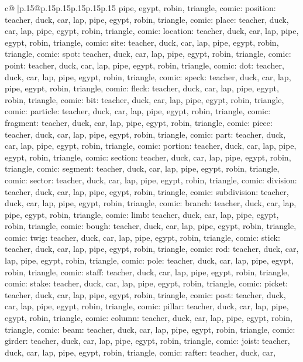 \documentclass{article}
\begin{document}
{\begin{supertabular}{c@{$\;$}|p{.15\linewidth}@{}p{.15\linewidth}p{.15\linewidth}p{.15\linewidth}p{.15\linewidth}p{.15\linewidth}}
{{{pipe, egypt, robin, triangle, comic\n\nCLUE: position\nTARGETS: teacher, duck, car, lap, pipe, egypt, robin, triangle, comic\n\nCLUE: place\nTARGETS: teacher, duck, car, lap, pipe, egypt, robin, triangle, comic\n\nCLUE: location\nTARGETS: teacher, duck, car, lap, pipe, egypt, robin, triangle, comic\n\nCLUE: site\nTARGETS: teacher, duck, car, lap, pipe, egypt, robin, triangle, comic\n\nCLUE: spot\nTARGETS: teacher, duck, car, lap, pipe, egypt, robin, triangle, comic\n\nCLUE: point\nTARGETS: teacher, duck, car, lap, pipe, egypt, robin, triangle, comic\n\nCLUE: dot\nTARGETS: teacher, duck, car, lap, pipe, egypt, robin, triangle, comic\n\nCLUE: speck\nTARGETS: teacher, duck, car, lap, pipe, egypt, robin, triangle, comic\n\nCLUE: fleck\nTARGETS: teacher, duck, car, lap, pipe, egypt, robin, triangle, comic\n\nCLUE: bit\nTARGETS: teacher, duck, car, lap, pipe, egypt, robin, triangle, comic\n\nCLUE: particle\nTARGETS: teacher, duck, car, lap, pipe, egypt, robin, triangle, comic\n\nCLUE: fragment\nTARGETS: teacher, duck, car, lap, pipe, egypt, robin, triangle, comic\n\nCLUE: piece\nTARGETS: teacher, duck, car, lap, pipe, egypt, robin, triangle, comic\n\nCLUE: part\nTARGETS: teacher, duck, car, lap, pipe, egypt, robin, triangle, comic\n\nCLUE: portion\nTARGETS: teacher, duck, car, lap, pipe, egypt, robin, triangle, comic\n\nCLUE: section\nTARGETS: teacher, duck, car, lap, pipe, egypt, robin, triangle, comic\n\nCLUE: segment\nTARGETS: teacher, duck, car, lap, pipe, egypt, robin, triangle, comic\n\nCLUE: sector\nTARGETS: teacher, duck, car, lap, pipe, egypt, robin, triangle, comic\n\nCLUE: division\nTARGETS: teacher, duck, car, lap, pipe, egypt, robin, triangle, comic\n\nCLUE: subdivision\nTARGETS: teacher, duck, car, lap, pipe, egypt, robin, triangle, comic\n\nCLUE: branch\nTARGETS: teacher, duck, car, lap, pipe, egypt, robin, triangle, comic\n\nCLUE: limb\nTARGETS: teacher, duck, car, lap, pipe, egypt, robin, triangle, comic\n\nCLUE: bough\nTARGETS: teacher, duck, car, lap, pipe, egypt, robin, triangle, comic\n\nCLUE: twig\nTARGETS: teacher, duck, car, lap, pipe, egypt, robin, triangle, comic\n\nCLUE: stick\nTARGETS: teacher, duck, car, lap, pipe, egypt, robin, triangle, comic\n\nCLUE: rod\nTARGETS: teacher, duck, car, lap, pipe, egypt, robin, triangle, comic\n\nCLUE: pole\nTARGETS: teacher, duck, car, lap, pipe, egypt, robin, triangle, comic\n\nCLUE: staff\nTARGETS: teacher, duck, car, lap, pipe, egypt, robin, triangle, comic\n\nCLUE: stake\nTARGETS: teacher, duck, car, lap, pipe, egypt, robin, triangle, comic\n\nCLUE: picket\nTARGETS: teacher, duck, car, lap, pipe, egypt, robin, triangle, comic\n\nCLUE: post\nTARGETS: teacher, duck, car, lap, pipe, egypt, robin, triangle, comic\n\nCLUE: pillar\nTARGETS: teacher, duck, car, lap, pipe, egypt, robin, triangle, comic\n\nCLUE: column\nTARGETS: teacher, duck, car, lap, pipe, egypt, robin, triangle, comic\n\nCLUE: beam\nTARGETS: teacher, duck, car, lap, pipe, egypt, robin, triangle, comic\n\nCLUE: girder\nTARGETS: teacher, duck, car, lap, pipe, egypt, robin, triangle, comic\n\nCLUE: joist\nTARGETS: teacher, duck, car, lap, pipe, egypt, robin, triangle, comic\n\nCLUE: rafter\nTARGETS: teacher, duck, car, }}}
\end{supertabular}}
\end{document}
